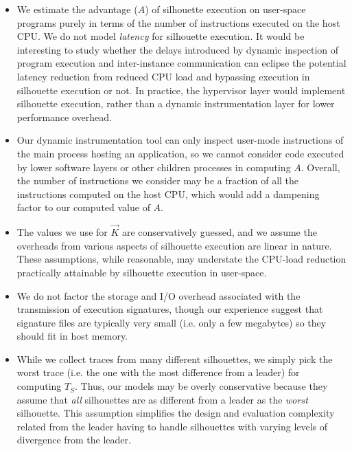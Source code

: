 \begin{itemize}
\item We estimate the advantage ($A$) of silhouette execution
on user-space programs purely in terms of the 
number of instructions executed on the host CPU.
We do not model {\em latency} for silhouette
execution. It would be interesting
to study whether the delays introduced
by dynamic inspection of program execution and inter-instance communication
can eclipse the potential latency reduction from reduced CPU load
and bypassing execution in silhouette
execution or not. In practice,
the hypervisor layer would implement silhouette execution,
rather than a dynamic instrumentation
layer for lower performance overhead.

\item Our dynamic instrumentation tool
can only inspect user-mode instructions
of the main process hosting an application,
so we cannot consider code
executed by lower software layers or other
children processes in computing $A$.
Overall, the number of instructions
we consider may be a fraction of all the
instructions computed on the host CPU,
which would add a dampening factor 
to our computed value of $A$.

\item 
The values we use for $\vec K$ are 
conservatively guessed, and
we assume the overheads from various
aspects of silhouette execution are linear in nature.
These assumptions, while reasonable, may understate
the CPU-load reduction practically attainable by silhouette
execution in user-space.

\item We do not factor the storage and I/O overhead
associated with the transmission of execution
signatures, though our experience
suggest that signature files are typically
very small (i.e. only a few megabytes)
so they should fit in host memory.

\item While we collect traces from many different silhouettes,
we simply pick the worst trace (i.e. the one with
the most difference from a leader) for computing
$T_S$. Thus, our models may be overly conservative because they assume that {\em all} 
silhouettes are as different from a leader as the {\em worst} silhouette.
This assumption simplifies the design and evaluation complexity related
from the leader having to handle silhouettes
with varying levels of divergence from
the leader.

\end{itemize}

